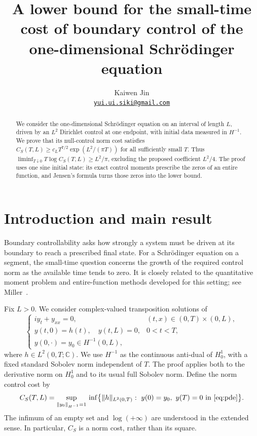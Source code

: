 \documentclass[11pt]{article}
\title{A lower bound for the small-time cost of boundary control of the one-dimensional Schr\"odinger equation}
\author{Kaiwen Jin\\\normalsize\href{mailto:yui.ui.siki@gmail.com}{\texttt{yui.ui.siki@gmail.com}}}
\date{}
\begin{document}
\maketitle
\begin{abstract}
We consider the one-dimensional Schr\"odinger equation on an interval of
length $L$, driven by an $L^2$ Dirichlet control at one endpoint, with initial
data measured in $H^{-1}$. We prove that its null-control norm cost satisfies
$C_S(T,L)\ge c_L T^{7/2}\exp(L^2/(\pi T))$ for all sufficiently small $T$.
Thus $\liminf_{T\downarrow0}T\log C_S(T,L)\ge L^2/\pi$, excluding the proposed
coefficient $L^2/4$. The proof uses one sine initial state: its exact control
moments prescribe the zeros of an entire function, and Jensen's formula turns
those zeros into the lower bound.
\end{abstract}

\section{Introduction and main result}\label{sec:intro}
Boundary controllability asks how strongly a system must be driven at its
boundary to reach a prescribed final state. For a Schr\"odinger equation on a
segment, the small-time question concerns the growth of the required control
norm as the available time tends to zero. It is closely related to the
quantitative moment problem and entire-function methods developed for this
setting; see Miller~\cite[Section 4]{Miller2003}.

Fix $L>0$. We consider complex-valued transposition solutions of
\begin{equation}\label{eq:pde}
 \begin{cases}
 i y_t+y_{xx}=0,&(t,x)\in(0,T)\times(0,L),\\
 y(t,0)=h(t),\quad y(t,L)=0,&0<t<T,\\
 y(0,\cdot)=y_0\in H^{-1}(0,L),&
 \end{cases}
\end{equation}
where $h\in L^2(0,T;\mathbb C)$. We use $H^{-1}$ as the continuous anti-dual
of $H_0^1$, with a fixed standard Sobolev norm independent of $T$.
The proof applies both to the derivative norm on $H_0^1$ and to its usual
full Sobolev norm. Define the norm control cost by
\begin{equation}\label{eq:cost}
 C_S(T,L)=\sup_{\|y_0\|_{H^{-1}}=1}\,
 \inf\bigl\{\|h\|_{L^2(0,T)}:\ y(0)=y_0,\ y(T)=0
 \text{ in }\eqref{eq:pde}\bigr\}.
\end{equation}
The infimum of an empty set and $\log(+\infty)$ are understood in the extended
sense. In particular, $C_S$ is a norm cost, rather than its square.
\end{document}
